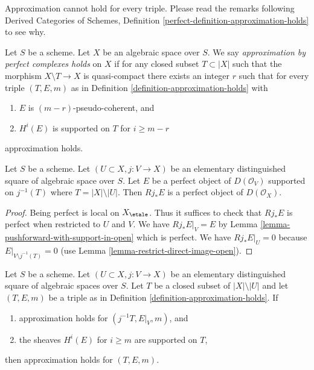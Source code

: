 \noindent
Approximation cannot hold for every triple. Please read the remarks following
Derived Categories of Schemes, Definition
\ref{perfect-definition-approximation-holds} to see why.

\begin{definition}
\label{definition-approximation}
Let $S$ be a scheme. Let $X$ be an algebraic space over $S$.
We say {\it approximation by perfect complexes holds}
on $X$ if for any closed subset $T \subset |X|$ such that
the morphism $X \setminus T \to X$ is quasi-compact
there exists an integer $r$ such that for every triple $(T, E, m)$ as in
Definition \ref{definition-approximation-holds} with
\begin{enumerate}
\item $E$ is $(m - r)$-pseudo-coherent, and
\item $H^i(E)$ is supported on $T$ for $i \geq m - r$
\end{enumerate}
approximation holds.
\end{definition}

\begin{lemma}
\label{lemma-pushforward-perfect}
Let $S$ be a scheme. Let $(U \subset X, j : V \to X)$ be an
elementary distinguished square of algebraic space over $S$.
Let $E$ be a perfect object of $D(\mathcal{O}_V)$ supported on
$j^{-1}(T)$ where $T = |X| \setminus |U|$. Then $Rj_*E$ is a
perfect object of $D(\mathcal{O}_X)$.
\end{lemma}

\begin{proof}
Being perfect is local on $X_\etale$. Thus it suffices to
check that $Rj_*E$ is perfect when restricted to $U$ and $V$.
We have $Rj_*E|_V = E$ by Lemma \ref{lemma-pushforward-with-support-in-open}
which is perfect. We have $Rj_*E|_U = 0$ because
$E|_{V \setminus j^{-1}(T)} = 0$ (use
Lemma \ref{lemma-restrict-direct-image-open}).
\end{proof}

\begin{lemma}
\label{lemma-open}
Let $S$ be a scheme. Let $(U \subset X, j : V \to X)$ be an elementary
distinguished square of algebraic spaces over $S$. Let $T$ be a closed
subset of $|X| \setminus |U|$ and let $(T, E, m)$ be a triple as in
Definition \ref{definition-approximation-holds}. If
\begin{enumerate}
\item approximation holds for $(j^{-1}T, E|_V, m)$, and
\item the sheaves $H^i(E)$ for $i \geq m$ are supported on $T$,
\end{enumerate}
then approximation holds for $(T, E, m)$.
\end{lemma}

